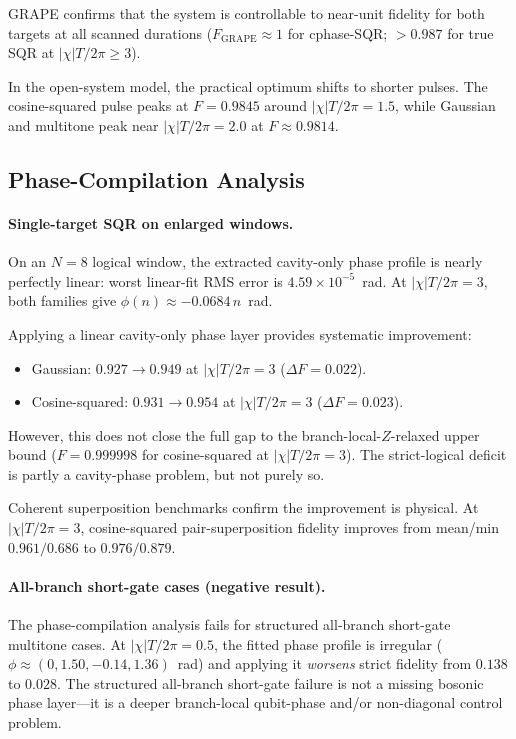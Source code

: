 \documentclass[aps,pra,twocolumn,reprint,amsmath,amssymb]{revtex4-2}
\begin{document}
GRAPE confirms that the system is controllable to near-unit fidelity for both targets at all scanned durations ($F_\mathrm{GRAPE}\approx 1$ for cphase-SQR; $>0.987$ for true SQR at $|\chi|T/2\pi\ge 3$).

In the open-system model, the practical optimum shifts to shorter pulses. The cosine-squared pulse peaks at $F=0.9845$ around $|\chi|T/2\pi=1.5$, while Gaussian and multitone peak near $|\chi|T/2\pi=2.0$ at $F\approx 0.9814$.

\subsection{Phase-Compilation Analysis}

\paragraph{Single-target SQR on enlarged windows.}
On an $N=8$ logical window, the extracted cavity-only phase profile is nearly perfectly linear: worst linear-fit RMS error is $4.59\times 10^{-5}$~rad. At $|\chi|T/2\pi=3$, both families give $\phi(n)\approx -0.0684\,n$~rad.

Applying a linear cavity-only phase layer provides systematic improvement:
\begin{itemize}
\item Gaussian: $0.927\to 0.949$ at $|\chi|T/2\pi=3$ ($\Delta F = 0.022$).
\item Cosine-squared: $0.931\to 0.954$ at $|\chi|T/2\pi=3$ ($\Delta F = 0.023$).
\end{itemize}
However, this does not close the full gap to the branch-local-$Z$-relaxed upper bound ($F=0.999998$ for cosine-squared at $|\chi|T/2\pi=3$). The strict-logical deficit is partly a cavity-phase problem, but not purely so.

Coherent superposition benchmarks confirm the improvement is physical. At $|\chi|T/2\pi=3$, cosine-squared pair-superposition fidelity improves from mean/min $0.961/0.686$ to $0.976/0.879$.

\paragraph{All-branch short-gate cases (negative result).}
The phase-compilation analysis fails for structured all-branch short-gate multitone cases. At $|\chi|T/2\pi=0.5$, the fitted phase profile is irregular ($\phi\approx (0, 1.50, -0.14, 1.36)$~rad) and applying it \emph{worsens} strict fidelity from $0.138$ to $0.028$. The structured all-branch short-gate failure is not a missing bosonic phase layer—it is a deeper branch-local qubit-phase and/or non-diagonal control problem.
\end{document}
